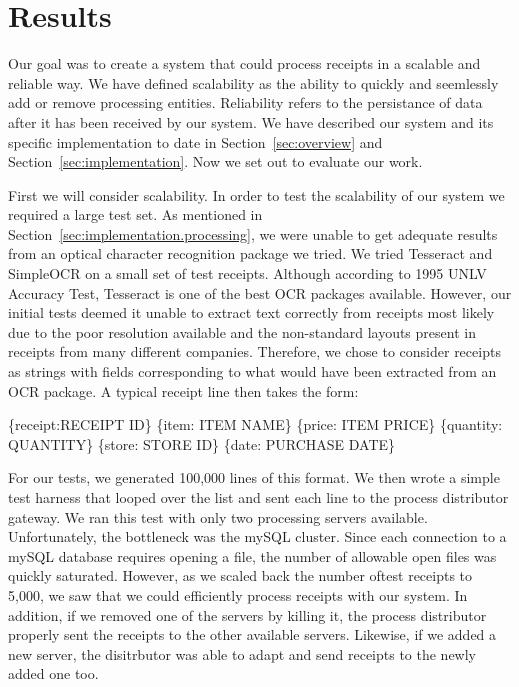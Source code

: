 \section{Results}
\label{sec:results}

Our goal was to create a system that could process receipts in a
scalable and reliable way. We have defined scalability as the ability
to quickly and seemlessly add or remove processing
entities. Reliability refers to the persistance of data after it has
been received by our system. We have described our system and its
specific implementation to date in Section~\ref{sec:overview} and
Section~\ref{sec:implementation}. Now we set out to evaluate our work.

First we will consider scalability. In order to test the scalability
of our system we required a large test set. As mentioned in
Section~\ref{sec:implementation.processing}, we were unable to get
adequate results from an optical character recognition package we
tried. We tried Tesseract and SimpleOCR on a small set of test
receipts. Although according to 1995 UNLV Accuracy Test, Tesseract is
one of the best OCR packages available. However, our initial tests
deemed it unable to extract text correctly from receipts most likely
due to the poor resolution available and the non-standard layouts
present in receipts from many different companies. Therefore, we chose to consider receipts as strings with fields corresponding to what would have been extracted from an OCR package. A typical receipt line then takes the form:

\begin{centering}
\{receipt:RECEIPT ID\} \{item: ITEM NAME\} \{price: ITEM PRICE\} \{quantity: QUANTITY\} \{store: STORE ID\} \{date: PURCHASE DATE\}
\end{centering}

For our tests, we generated 100,000 lines of this format. We then
wrote a simple test harness that looped over the list and sent each
line to the process distributor gateway. We ran this test with only
two processing servers available. Unfortunately, the bottleneck was
the mySQL cluster. Since each connection to a mySQL database requires
opening a file, the number of allowable open files was quickly
saturated. However, as we scaled back the number oftest receipts to
5,000, we saw that we could efficiently process receipts with our
system. In addition, if we removed one of the servers by killing it,
the process distributor properly sent the receipts to the other
available servers. Likewise, if we added a new server, the disitrbutor
was able to adapt and send receipts to the newly added one too.
